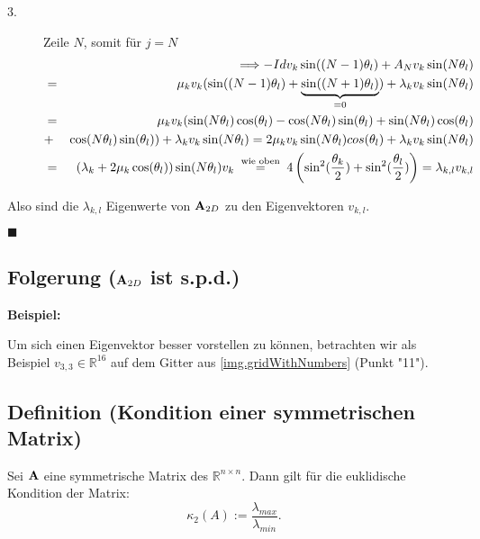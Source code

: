 \begin{description}
\item[3.] Zeile $N$, somit für $j = N$
\begin{eqnarray}
&&\Longrightarrow -Id v_{k} \sin((N-1)\theta_{l}) + A_{N} v_{k} \sin(N \theta_{l}) \notag \\
&=& \mu_{k} v_{k} (\sin((N-1)\theta_{l}) + \underbrace{\sin((N+1)\theta_{l})}_{= 0}) + \lambda_{k} v_{k} \sin(N\theta_{l}) \notag \\
&=& \mu_{k} v_{k} (\sin(N\theta_{l})\cos(\theta_{l}) - \cos(N\theta_{l})\sin(\theta_{l}) + \sin(N\theta_{l})\cos(\theta_{l}) \notag \\
&+& \cos(N\theta_{l})\sin(\theta_{l})) + \lambda_{k} v_{k} \sin(N \theta_{l}) = 2\mu_{k} v_{k} \sin(N\theta_{l})cos(\theta_{l}) + \lambda_{k} v_{k} \sin(N\theta_{l}) \notag \\
&=& (\lambda_{k} + 2\mu_{k}\cos(\theta_{l})) \sin(N\theta_{l}) v_{k} \overset{\textnormal{ wie oben }}{=} 4 \left(\sin^{2}(\frac {\theta_{k}} {2}) + \sin^{2}(\frac {\theta_{l}} {2})\right) = \lambda_{k,l} v_{k,l} \notag
\end{eqnarray}
\end{description}
Also sind die $\lambda_{k,l}$ Eigenwerte von ${\textbf{A}}_{2D}$ zu den Eigenvektoren $v_{k,l}$.
\begin{flushright}
$\blacksquare$
\end{flushright}

\subsection{Folgerung (${\textbf{A}}_{2D}$ ist s.p.d.)}

\textbf{Beispiel:}

Um sich einen Eigenvektor besser vorstellen zu können, betrachten wir als Beispiel $v_{3,3} \in \mathbb{R}^{16}$ auf dem Gitter aus \autoref{img.gridWithNumbers} (Punkt "11").

\label{img.Jacobi1}

\subsection{Definition (Kondition einer symmetrischen Matrix)}\label{ss.Definition Kondition einer Matrix}

Sei ${\textbf{A}}$ eine symmetrische Matrix des $\mathbb{R}^{n \times n}$. Dann gilt für die euklidische Kondition der Matrix:
\begin{equation}
\kappa_{2} (A) := \frac {\lambda_{max}} {\lambda_{min}}.\label{eq.Kondition}
\end{equation}

